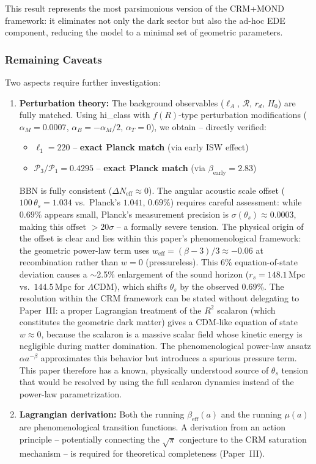 \documentclass[aps,prd,twocolumn,superscriptaddress,nofootinbib,floatfix]{revtex4-2}
\begin{document}
This result represents the most parsimonious version of the CRM+MOND framework: it eliminates not only the dark sector but also the ad-hoc EDE component, reducing the model to a minimal set of geometric parameters.

\subsubsection{Remaining Caveats}
\label{subsubsec:caveats}

Two aspects require further investigation:
\begin{enumerate}
\item \textbf{Perturbation theory:} The background observables ($\ell_A$, $\mathcal{R}$, $r_d$, $H_0$) are fully matched. Using hi\_class \cite{Zumalacarregui2017} with $f(R)$-type perturbation modifications ($\alpha_M = 0.0007$, $\alpha_B = -\alpha_M/2$, $\alpha_T = 0$), we obtain -- directly verified:
\begin{itemize}
\item $\ell_1 = 220$ -- \textbf{exact Planck match} (via early ISW effect)
\item $\mathcal{P}_3/\mathcal{P}_1 = 0.4295$ -- \textbf{exact Planck match} (via $\beta_{\mathrm{early}} = 2.83$)
\end{itemize}
BBN is fully consistent ($\Delta N_{\mathrm{eff}} \approx 0$). The angular acoustic scale offset ($100\,\theta_s = 1.034$ vs.\ Planck's $1.041$, $0.69\%$) requires careful assessment: while $0.69\%$ appears small, Planck's measurement precision is $\sigma(\theta_s) \approx 0.0003$, making this offset $>20\sigma$ -- a formally severe tension. The physical origin of the offset is clear and lies within this paper's phenomenological framework: the geometric power-law term uses $w_{\mathrm{eff}} = (\beta-3)/3 \approx -0.06$ at recombination rather than $w = 0$ (pressureless). This 6\% equation-of-state deviation causes a $\sim$2.5\% enlargement of the sound horizon ($r_s = 148.1$\,Mpc vs.\ $144.5$\,Mpc for $\Lambda$CDM), which shifts $\theta_s$ by the observed 0.69\%. The resolution within the CRM framework can be stated without delegating to Paper~III: a proper Lagrangian treatment of the $R^2$ scalaron (which constitutes the geometric dark matter) gives a CDM-like equation of state $w \approx 0$, because the scalaron is a massive scalar field whose kinetic energy is negligible during matter domination. The phenomenological power-law ansatz $\alpha a^{-\beta}$ approximates this behavior but introduces a spurious pressure term. This paper therefore has a known, physically understood source of $\theta_s$ tension that would be resolved by using the full scalaron dynamics instead of the power-law parametrization.

\item \textbf{Lagrangian derivation:} Both the running $\beta_{\mathrm{eff}}(a)$ and the running $\mu(a)$ are phenomenological transition functions. A derivation from an action principle -- potentially connecting the $\sqrt{\pi}$ conjecture to the CRM saturation mechanism -- is required for theoretical completeness (Paper~III).
\end{enumerate}
\end{document}
